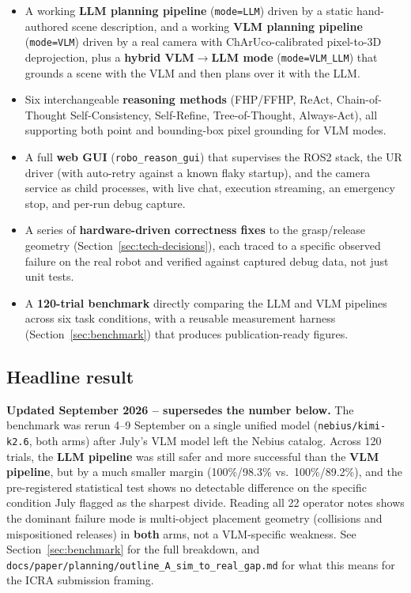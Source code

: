 \begin{itemize}[nosep]
  \item A working \textbf{LLM planning pipeline} (\texttt{mode=LLM}) driven
    by a static hand-authored scene description, and a working
    \textbf{VLM planning pipeline} (\texttt{mode=VLM}) driven by a real
    camera with ChArUco-calibrated pixel-to-3D deprojection, plus a
    \textbf{hybrid VLM$\to$LLM mode} (\texttt{mode=VLM\_LLM}) that grounds a
    scene with the VLM and then plans over it with the LLM.
  \item Six interchangeable \textbf{reasoning methods}
    (FHP/FFHP, ReAct, Chain-of-Thought Self-Consistency, Self-Refine,
    Tree-of-Thought, Always-Act), all supporting both point and bounding-box
    pixel grounding for VLM modes.
  \item A full \textbf{web GUI} (\texttt{robo\_reason\_gui}) that supervises
    the ROS2 stack, the UR driver (with auto-retry against a known flaky
    startup), and the camera service as child processes, with live chat,
    execution streaming, an emergency stop, and per-run debug capture.
  \item A series of \textbf{hardware-driven correctness fixes} to the
    grasp/release geometry (Section~\ref{sec:tech-decisions}), each traced to
    a specific observed failure on the real robot and verified against
    captured debug data, not just unit tests.
  \item A \textbf{120-trial benchmark} directly comparing the LLM and VLM
    pipelines across six task conditions, with a reusable measurement
    harness (Section~\ref{sec:benchmark}) that produces publication-ready
    figures.
\end{itemize}

\subsection*{Headline result}

\textbf{Updated September 2026 -- supersedes the number below.} The
benchmark was rerun 4--9 September on a single unified model
(\texttt{nebius/kimi-k2.6}, both arms) after July's VLM model left the
Nebius catalog. Across 120 trials, the \textbf{LLM pipeline} was still
safer and more successful than the \textbf{VLM pipeline}, but by a much
smaller margin (100\%/98.3\% vs.\ 100\%/89.2\%), and the pre-registered
statistical test shows no detectable difference on the specific condition
July flagged as the sharpest divide. Reading all 22 operator notes shows
the dominant failure mode is multi-object placement geometry (collisions
and mispositioned releases) in \textbf{both} arms, not a VLM-specific
weakness. See Section~\ref{sec:benchmark} for the full breakdown, and
\texttt{docs/paper/planning/outline\_A\_sim\_to\_real\_gap.md} for what this
means for the ICRA submission framing.

